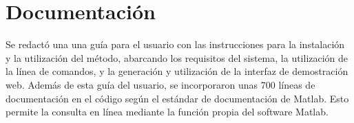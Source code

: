 %
%
\section{Documentación}
%
Se redactó una una guía para el usuario con las instrucciones para la
instalación y la utilización del método, abarcando los requisitos del
sistema, la utilización de la línea de comandos, y la generación y
utilización de la interfaz de demostración web.
Además de esta guía del usuario, se incorporaron unas 700 líneas de
documentación en el código según el estándar de documentación de
Matlab.
Esto permite la consulta en línea mediante la función 
propia del software Matlab.
